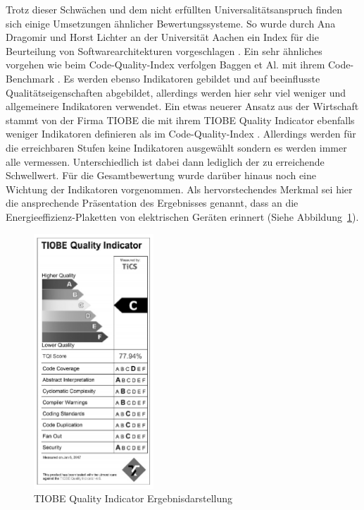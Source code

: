 \documentclass[da,ngerman]{stthesis}
\begin{document}
			Trotz dieser Schwächen und dem nicht erfüllten Universalitätsanspruch finden sich einige Umsetzungen ähnlicher Bewertungssysteme. So wurde durch Ana Dragomir und Horst Lichter an der Universität Aachen ein Index für die Beurteilung von Softwarearchitekturen vorgeschlagen \cite{ArchitectureIndex}. \newline
			Ein sehr ähnliches vorgehen wie beim Code-Quality-Index verfolgen Baggen et Al. mit ihrem Code-Benchmark \cite{CodeBenchmark}. Es werden ebenso Indikatoren gebildet und auf beeinflusste Qualitätseigenschaften abgebildet, allerdings werden hier sehr viel weniger und allgemeinere Indikatoren verwendet. Ein etwas neuerer Ansatz aus der Wirtschaft stammt von der Firma TIOBE die mit ihrem TIOBE Quality Indicator ebenfalls weniger Indikatoren definieren als im Code-Quality-Index \cite{TIOBEIndex}. Allerdings werden für die erreichbaren Stufen keine Indikatoren ausgewählt sondern es werden immer alle vermessen. Unterschiedlich ist dabei dann lediglich der zu erreichende Schwellwert. Für die Gesamtbewertung wurde darüber hinaus noch eine Wichtung der Indikatoren vorgenommen. Als hervorstechendes Merkmal sei hier die ansprechende Präsentation des Ergebnisses genannt, dass an die Energieeffizienz-Plaketten von elektrischen Geräten erinnert (Siehe Abbildung~\ref{TIOBElabel}). \newline
			\begin{figure} [h]
				\centering
				\includegraphics [width=0.4\textwidth] {tiobe.png}
				\caption{TIOBE Quality Indicator Ergebnisdarstellung \cite{TIOBEIndex}}
				\label{TIOBElabel}
			\end{figure}
\end{document}
